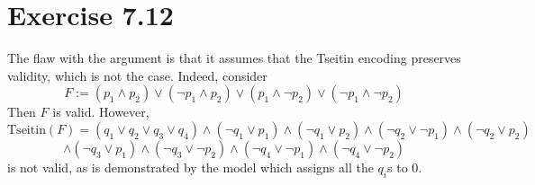 \documentclass{article}
\newcommand{\Vars}{\mathrm{Vars}}
\begin{document}
\section*{Exercise 7.12}
The flaw with the argument is that it assumes that the Tseitin encoding preserves validity, which is not the case. Indeed, consider 
$$F := (p_1\wedge p_2)\lor(\lnot p_1\wedge p_2)\lor(p_1\wedge \lnot p_2)\lor(\lnot p_1\wedge \lnot p_2)$$
Then $F$ is valid. However, 
$$\mathrm{Tseitin}(F) = (q_1\lor q_2\lor q_3\lor q_4)\wedge (\lnot q_1\lor p_1)\wedge (\lnot q_1\lor p_2)\wedge (\lnot q_2\lor \lnot p_1)\wedge (\lnot q_2\lor p_2)$$
$$\wedge (\lnot q_3\lor p_1)\wedge (\lnot q_3\lor \lnot p_2)\wedge (\lnot q_4\lor \lnot p_1)\wedge (\lnot q_4\lor \lnot p_2)$$
is not valid, as is demonstrated by the model which assigns all the $q_i$s to $0$.\\
\end{document}
